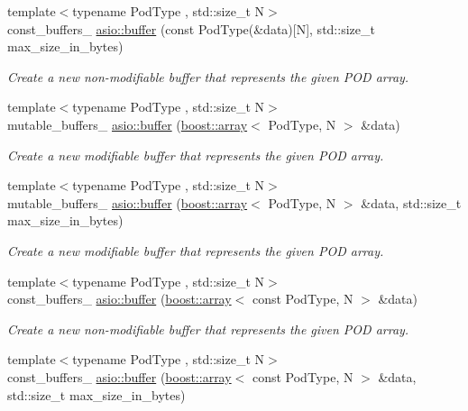 \begin{DoxyCompactItemize}
{\footnotesize template$<$typename Pod\+Type , std\+::size\+\_\+t N$>$ }\\const\+\_\+buffers\+\_ \hyperlink{group__buffer_gae37e6d30503997261200b1c9a2492182}{asio\+::buffer} (const Pod\+Type(\&data)\mbox{[}N\mbox{]}, std\+::size\+\_\+t max\+\_\+size\+\_\+in\+\_\+bytes)
\begin{DoxyCompactList}\small\item\em Create a new non-\/modifiable buffer that represents the given P\+O\+D array. \end{DoxyCompactList}\item 
{\footnotesize template$<$typename Pod\+Type , std\+::size\+\_\+t N$>$ }\\mutable\+\_\+buffers\+\_ \hyperlink{group__buffer_gafec66696edfddf306d7c91aba75b1723}{asio\+::buffer} (\hyperlink{classboost_1_1array}{boost\+::array}$<$ Pod\+Type, N $>$ \&data)
\begin{DoxyCompactList}\small\item\em Create a new modifiable buffer that represents the given P\+O\+D array. \end{DoxyCompactList}\item 
{\footnotesize template$<$typename Pod\+Type , std\+::size\+\_\+t N$>$ }\\mutable\+\_\+buffers\+\_ \hyperlink{group__buffer_gabcdc30c4b4b6a28885f65e7c8fe08cc2}{asio\+::buffer} (\hyperlink{classboost_1_1array}{boost\+::array}$<$ Pod\+Type, N $>$ \&data, std\+::size\+\_\+t max\+\_\+size\+\_\+in\+\_\+bytes)
\begin{DoxyCompactList}\small\item\em Create a new modifiable buffer that represents the given P\+O\+D array. \end{DoxyCompactList}\item 
{\footnotesize template$<$typename Pod\+Type , std\+::size\+\_\+t N$>$ }\\const\+\_\+buffers\+\_ \hyperlink{group__buffer_ga7b564725e9315afaad270e46161ac21c}{asio\+::buffer} (\hyperlink{classboost_1_1array}{boost\+::array}$<$ const Pod\+Type, N $>$ \&data)
\begin{DoxyCompactList}\small\item\em Create a new non-\/modifiable buffer that represents the given P\+O\+D array. \end{DoxyCompactList}\item 
{\footnotesize template$<$typename Pod\+Type , std\+::size\+\_\+t N$>$ }\\const\+\_\+buffers\+\_ \hyperlink{group__buffer_gaf0529bedd017b4b01fd0920e35ed22cd}{asio\+::buffer} (\hyperlink{classboost_1_1array}{boost\+::array}$<$ const Pod\+Type, N $>$ \&data, std\+::size\+\_\+t max\+\_\+size\+\_\+in\+\_\+bytes)

\end{DoxyCompactItemize}
